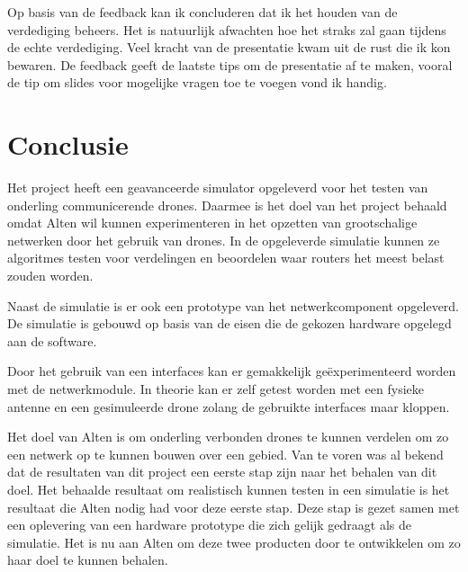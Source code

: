 \documentclass[a4paper, 11pt, oneside]{report}
\begin{document}
Op basis van de feedback kan ik concluderen dat ik het houden van de verdediging beheers.
Het is natuurlijk afwachten hoe het straks zal gaan tijdens de echte verdediging.
Veel kracht van de presentatie kwam uit de rust die ik kon bewaren.
De feedback geeft de laatste tips om de presentatie af te maken, vooral de tip om slides voor mogelijke vragen toe te voegen vond ik handig.


\chapter{Conclusie}\label{sec:conclusie}
Het project heeft een geavanceerde simulator opgeleverd voor het testen van onderling communicerende drones.
Daarmee is het doel van het project behaald omdat Alten wil kunnen experimenteren in het opzetten van grootschalige netwerken door het gebruik van drones.
In de opgeleverde simulatie kunnen ze algoritmes testen voor verdelingen en beoordelen waar routers het meest belast zouden worden.

Naast de simulatie is er ook een prototype van het netwerkcomponent opgeleverd. 
De simulatie is gebouwd op basis van de eisen die de gekozen hardware opgelegd aan de software.
 
Door het gebruik van een interfaces kan er gemakkelijk geëxperimenteerd worden met de netwerkmodule.
In theorie kan er zelf getest worden met een fysieke antenne en een gesimuleerde drone zolang de gebruikte interfaces maar kloppen.

Het doel van Alten is om onderling verbonden drones te kunnen verdelen om zo een netwerk op te kunnen bouwen over een gebied.
Van te voren was al bekend dat de resultaten van dit project een eerste stap zijn naar het behalen van dit doel.
Het behaalde resultaat om realistisch kunnen testen in een simulatie is het resultaat die Alten nodig had voor deze eerste stap. 
Deze stap is gezet samen met een oplevering van een hardware prototype die zich gelijk gedraagt als de simulatie.
Het is nu aan Alten om deze twee producten door te ontwikkelen om zo haar doel te kunnen behalen.
\end{document}

